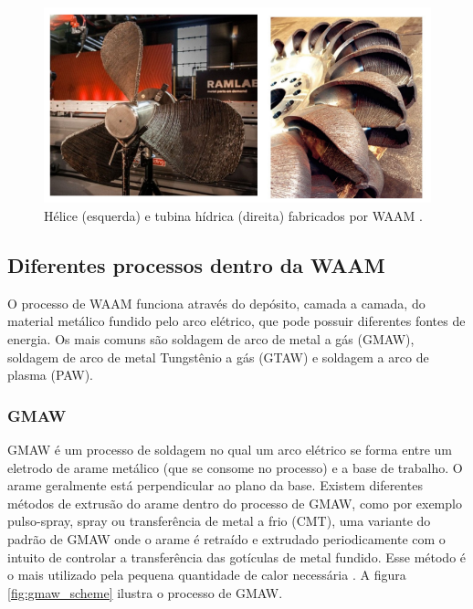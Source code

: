 \begin{figure}[hbt!]
    \centering
    \includegraphics[width=0.8\linewidth]{Imagens/chap02/waam_parts.png}
    \caption{Hélice (esquerda) e tubina hídrica (direita) fabricados por WAAM \cite{feldmann20193d}.}
    \label{fig:waam_parts}
\end{figure}

\newpage
\subsection{Diferentes processos dentro da WAAM}
O processo de WAAM funciona através do depósito, camada a camada, do material metálico fundido pelo arco elétrico, que pode possuir diferentes fontes de energia. Os mais comuns são soldagem de arco de metal a gás (GMAW), soldagem de arco de metal Tungstênio a gás (GTAW) e soldagem a arco de plasma (PAW). \cite{pan2018arc}

\subsubsection{GMAW}
GMAW é um processo de soldagem no qual um arco elétrico se forma entre um eletrodo de arame metálico (que se consome no processo) e a base de trabalho. O arame geralmente está perpendicular ao plano da base. Existem diferentes métodos de extrusão do arame dentro do processo de GMAW, como por exemplo pulso-spray, spray ou transferência de metal a frio (CMT), uma variante do padrão de GMAW onde o arame é retraído e extrudado periodicamente com o intuito de controlar a transferência das gotículas de metal fundido. Esse método é o mais utilizado pela pequena quantidade de calor necessária \cite{pan2018arc}. A figura \ref{fig:gmaw_scheme} ilustra o processo de GMAW.


